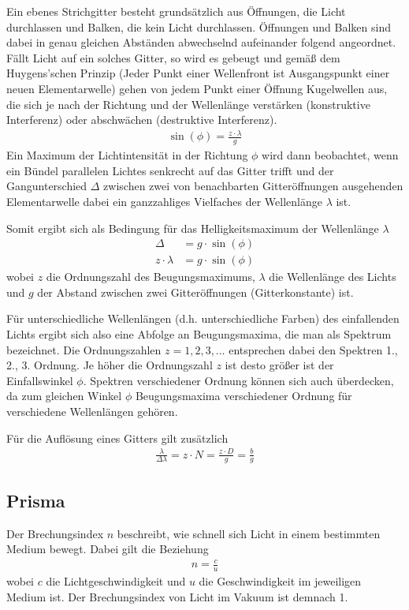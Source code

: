\documentclass{article}
\begin{document}
Ein ebenes Strichgitter besteht grundsätzlich aus Öffnungen, die Licht durchlassen und Balken, die kein Licht durchlassen. Öffnungen und Balken sind dabei in genau gleichen Abständen abwechselnd aufeinander folgend angeordnet. Fällt Licht auf ein solches Gitter, so wird es gebeugt und gemäß dem Huygens'schen Prinzip (Jeder Punkt einer Wellenfront ist Ausgangspunkt einer neuen Elementarwelle) gehen von jedem Punkt einer Öffnung Kugelwellen aus, die sich je nach der Richtung und der Wellenlänge verstärken (konstruktive Interferenz) oder abschwächen (destruktive Interferenz).
\begin{align}
\label{eq:gitterkonst}
\sin(\phi) = \frac{z\cdot\lambda}{g}
\end{align}
Ein Maximum der Lichtintensität in der Richtung $\phi$ wird dann beobachtet, wenn ein Bündel parallelen Lichtes senkrecht auf das Gitter trifft und der Gangunterschied $\Delta$ zwischen zwei von benachbarten Gitteröffnungen ausgehenden Elementarwelle dabei ein ganzzahliges Vielfaches der Wellenlänge $\lambda$ ist.

Somit ergibt sich als Bedingung für das Helligkeitsmaximum der Wellenlänge $\lambda$
\begin{align}
\Delta &= g\cdot \sin(\phi)\\
z\cdot\lambda &= g\cdot\sin(\phi)
\end{align}
wobei $z$ die Ordnungszahl des Beugungsmaximums, $\lambda$ die Wellenlänge des Lichts und $g$ der Abstand zwischen zwei Gitteröffnungen (Gitterkonstante) ist.

Für unterschiedliche Wellenlängen (d.h. unterschiedliche Farben) des einfallenden Lichts ergibt sich also eine Abfolge an Beugungsmaxima, die man als Spektrum bezeichnet. Die Ordnungszahlen $z = 1,2,3,\dots$ entsprechen dabei den Spektren 1., 2., 3. Ordnung. Je höher die Ordnungszahl $z$ ist desto größer ist der Einfallswinkel $\phi$. Spektren verschiedener Ordnung können sich auch überdecken, da zum gleichen Winkel $\phi$ Beugungsmaxima verschiedener Ordnung für verschiedene Wellenlängen gehören.

Für die Auflösung eines Gitters gilt zusätzlich
\begin{align}
\label{eq:aufl_gitter}
\frac{\lambda}{\Delta \lambda} = z\cdot N = \frac{z\cdot D}{g} =  \frac{b}{g}
\end{align}



\subsection{Prisma}
Der Brechungsindex $n$ beschreibt, wie schnell sich Licht in einem bestimmten Medium bewegt. Dabei gilt die Beziehung
\begin{align*}
n = \frac{c}{u}
\end{align*}
wobei $c$ die Lichtgeschwindigkeit und $u$ die Geschwindigkeit im jeweiligen Medium ist. Der Brechungsindex von Licht im Vakuum ist demnach 1.
\end{document}
